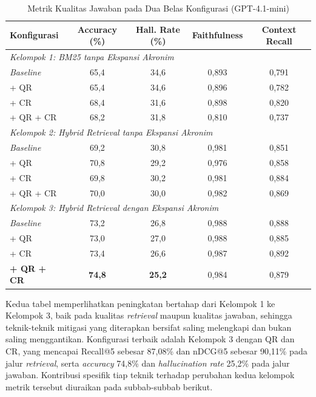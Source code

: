 \begin{table}[H]
\centering
\small
\setlength{\tabcolsep}{6pt}
\caption{Metrik Kualitas Jawaban pada Dua Belas Konfigurasi (GPT-4.1-mini)}
\label{tbl:generasi-12-konfigurasi}
\begin{tabular}{lcccc}
\toprule
\textbf{Konfigurasi} & \textbf{Accuracy (\%)} & \textbf{Hall. Rate (\%)} & \textbf{Faithfulness} & \textbf{Context Recall} \\
\midrule
\multicolumn{5}{l}{\textit{Kelompok 1: BM25 tanpa Ekspansi Akronim}} \\
\quad \textit{Baseline}  & 65{,}4 & 34{,}6 & 0{,}893 & 0{,}791 \\
\quad + QR               & 65{,}4 & 34{,}6 & 0{,}896 & 0{,}782 \\
\quad + CR               & 68{,}4 & 31{,}6 & 0{,}898 & 0{,}820 \\
\quad + QR + CR          & 68{,}2 & 31{,}8 & 0{,}810 & 0{,}737 \\
\midrule
\multicolumn{5}{l}{\textit{Kelompok 2: Hybrid Retrieval tanpa Ekspansi Akronim}} \\
\quad \textit{Baseline}  & 69{,}2 & 30{,}8 & 0{,}981 & 0{,}851 \\
\quad + QR               & 70{,}8 & 29{,}2 & 0{,}976 & 0{,}858 \\
\quad + CR               & 69{,}8 & 30{,}2 & 0{,}981 & 0{,}884 \\
\quad + QR + CR          & 70{,}0 & 30{,}0 & 0{,}982 & 0{,}869 \\
\midrule
\multicolumn{5}{l}{\textit{Kelompok 3: Hybrid Retrieval dengan Ekspansi Akronim}} \\
\quad \textit{Baseline}  & 73{,}2 & 26{,}8 & 0{,}988 & 0{,}888 \\
\quad + QR               & 73{,}0 & 27{,}0 & 0{,}988 & 0{,}885 \\
\quad + CR               & 73{,}4 & 26{,}6 & 0{,}987 & 0{,}892 \\
\quad \textbf{+ QR + CR} & \textbf{74{,}8} & \textbf{25{,}2} & 0{,}984 & 0{,}879 \\
\bottomrule
\end{tabular}
\end{table}

Kedua tabel memperlihatkan peningkatan bertahap dari Kelompok 1 ke Kelompok 3, baik pada kualitas \textit{retrieval} maupun kualitas jawaban, sehingga teknik-teknik mitigasi yang diterapkan bersifat saling melengkapi dan bukan saling menggantikan. Konfigurasi terbaik adalah Kelompok 3 dengan QR dan CR, yang mencapai Recall@5 sebesar 87{,}08\% dan nDCG@5 sebesar 90{,}11\% pada jalur \textit{retrieval}, serta \textit{accuracy} 74{,}8\% dan \textit{hallucination rate} 25{,}2\% pada jalur jawaban. Kontribusi spesifik tiap teknik terhadap perubahan kedua kelompok metrik tersebut diuraikan pada subbab-subbab berikut.

